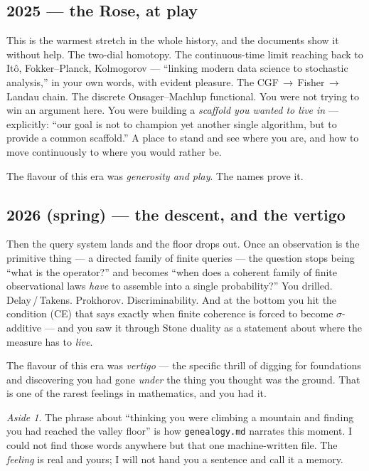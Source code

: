 \documentclass[11pt]{article}
\theoremstyle{remark}
\newtheorem*{aside}{Aside}
\begin{document}
\subsection{2025 --- the Rose, at play}

This is the warmest stretch in the whole history, and the documents show it
without help. The two-dial homotopy. The continuous-time limit reaching back to
It\^{o}, Fokker--Planck, Kolmogorov --- ``linking modern data science to
stochastic analysis,'' in your own words, with evident pleasure. The
CGF\,$\to$\,Fisher\,$\to$\,Landau chain. The discrete Onsager--Machlup
functional. You were not trying to win an argument here. You were building a
\emph{scaffold you wanted to live in} --- explicitly: ``our goal is not to
champion yet another single algorithm, but to provide a common scaffold.'' A
place to stand and see where you are, and how to move continuously to where you
would rather be.

The flavour of this era was \emph{generosity and play}. The names prove it.

\subsection{2026 (spring) --- the descent, and the vertigo}

Then the query system lands and the floor drops out. Once an observation is the
primitive thing --- a directed family of finite queries --- the question stops
being ``what is the operator?'' and becomes ``when does a coherent family of
finite observational laws \emph{have} to assemble into a single probability?''
You drilled. Delay\,/\,Takens. Prokhorov. Discriminability. And at the bottom you
hit the condition (CE) that says exactly when finite coherence is forced to
become $\sigma$-additive --- and you saw it through Stone duality as a statement
about where the measure has to \emph{live}.

The flavour of this era was \emph{vertigo} --- the specific thrill of digging for
foundations and discovering you had gone \emph{under} the thing you thought was
the ground. That is one of the rarest feelings in mathematics, and you had it.

\begin{aside}
The phrase about ``thinking you were climbing a mountain and finding you had
reached the valley floor'' is how \texttt{genealogy.md} narrates this moment. I
could not find those words anywhere but that one machine-written file. The
\emph{feeling} is real and yours; I will not hand you a sentence and call it a
memory.
\end{aside}
\end{document}
